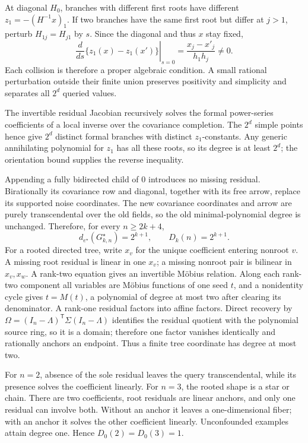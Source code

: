 At diagonal \(H_0\), branches with different first roots have different \(z_1=-(H^{-1}x)_1\). If two branches have the same first root but differ at \(j>1\), perturb \(H_{1j}=H_{j1}\) by \(s\). Since the diagonal and thus \(x\) stay fixed,
\[
\left.\frac{d}{ds}\{z_1(x)-z_1(x')\}\right|_{s=0}
=\frac{x_j-x'_j}{h_1h_j}\ne0.
\]
Each collision is therefore a proper algebraic condition. A small rational perturbation outside their finite union preserves positivity and simplicity and separates all \(2^d\) queried values.

The invertible residual Jacobian recursively solves the formal power-series coefficients of a local inverse over the covariance completion. The \(2^d\) simple points hence give \(2^d\) distinct formal branches with distinct \(z_1\)-constants. Any generic annihilating polynomial for \(z_1\) has all these roots, so its degree is at least \(2^d\); the orientation bound supplies the reverse inequality.

Appending a fully bidirected child of \(0\) introduces no missing residual. Birationally its covariance row and diagonal, together with its free arrow, replace its supported noise coordinates. The new covariance coordinates and arrow are purely transcendental over the old fields, so the old minimal-polynomial degree is unchanged. Therefore, for every \(n\ge2k+4\),
\[
d_{e^\star}(G^\star_{k,n})=2^{k+1},\qquad D_k(n)=2^{k+1}.
\]
For a rooted directed tree, write \(x_v\) for the unique coefficient entering nonroot \(v\). A missing root residual is linear in one \(x_v\); a missing nonroot pair is bilinear in \(x_v,x_w\). A rank-two equation gives an invertible Möbius relation. Along each rank-two component all variables are Möbius functions of one seed \(t\), and a nonidentity cycle gives \(t=M(t)\), a polynomial of degree at most two after clearing its denominator. A rank-one residual factors into affine factors. Direct recovery by \(\Omega=(I_n-\Lambda)^{\mathsf T}\Sigma(I_n-\Lambda)\) identifies the residual quotient with the polynomial source ring, so it is a domain; therefore one factor vanishes identically and rationally anchors an endpoint. Thus a finite tree coordinate has degree at most two.

For \(n=2\), absence of the sole residual leaves the query transcendental, while its presence solves the coefficient linearly. For \(n=3\), the rooted shape is a star or chain. There are two coefficients, root residuals are linear anchors, and only one residual can involve both. Without an anchor it leaves a one-dimensional fiber; with an anchor it solves the other coefficient linearly. Unconfounded examples attain degree one. Hence \(D_0(2)=D_0(3)=1\).

